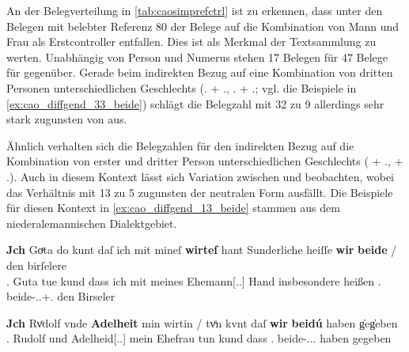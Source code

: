An der Belegverteilung in \cref{tab:caosimprefctrl} ist zu erkennen, dass unter
den Belegen mit belebter Referenz 80\pct{} der Belege auf die Kombination von
Mann und Frau als Erstcontroller entfallen. Dies ist als Merkmal der
Textsammlung zu werten. Unabhängig von Person und Numerus stehen 17 Belegen für
 47 Belege für  gegenüber. Gerade beim
indirekten Bezug auf eine Kombination von dritten Personen unterschiedlichen
Geschlechts (\Tsg.\MascM{} + \Tsg.\FemF, \Tsg.\FemF{} + \Tsg.\MascM; vgl. die
Beispiele in \cref{ex:cao_diffgend_33_beide}) schlägt die Belegzahl mit 32 zu 9
allerdings sehr stark zugunsten von  aus.

Ähnlich verhalten sich die Belegzahlen für den indirekten Bezug auf die
Kombination von erster und dritter Person unterschiedlichen Geschlechts
(\Fsg\subM{} + \Tsg.\FemF, \Fsg\subF{} + \Tsg.\MascM). Auch in diesem
Kontext lässt sich Variation zwischen  und 
beobachten, wobei das Verhältnis mit 13 zu 5 zugunsten der neutralen Form
ausfällt. Die Beispiele für diesen Kontext in \cref{ex:cao_diffgend_13_beide}
stammen aus
dem niederalemannischen Dialektgebiet.

\begin{exe}
\ex \label{ex:cao_diffgend_13_beide}
	\begin{xlist}
	\ex \label{ex:cao_diffgend_13_beide_1}
		\gll \textbf{Jch} Goͮta \textelp{} do kunt \textelp{} daſ ich mit mineſ
			\textbf{wirteſ} hant \textelp{} Sunderliche heiſſe \textbf{wir}
			\textbf{beide} / den birſelere~\scalebox{.9}{\textelp{}} \\
			\Fsg\subF.\Nom{} Guta {} tue kund {} dass ich mit meines
			Ehemann[\Gen.\Sg.\MascM] Hand {} insbesondere heißen
			\Fpl\subMF.\Nom{} beide-\Nom.\Pl.\M+\F\subMF.\St{} {} den
			Birseler~{} \\
		\begin{taggedline}{\parencites(Basel, 1273)[\pno~199, 210.21--28]{cao1}}
		\trans {}
		\end{taggedline}

	\ex \label{ex:cao_diffgend_13_beide_2}
		\gll \textbf{Jch} Rvͦdolf \textelp{} vnde \textbf{Adelheit} min wirtin / tvͤn
			kvnt \textelp{} daſ \textbf{wir} \textbf{beidú} \textelp{} haben
			g̍eg̍eben \textelp{} \\
			\Fsg\subM.\Nom{} Rudolf {} und Adelheid[\Nom.\Sg.\FemF] mein
			Ehefrau {} tun kund {} dass \Fpl\subMF.\Nom{}
			beide-\Nom.\Pl.\NeutMF.\St{} {} haben gegeben {}\\
		\begin{taggedline}{\parencites(Guebwiller, Dépt.~Haut-Rhin, 1289)[\pno~1154, 432.5--11]{cao2}}
		\trans {}
		\end{taggedline}
	\end{xlist}
\end{exe}

